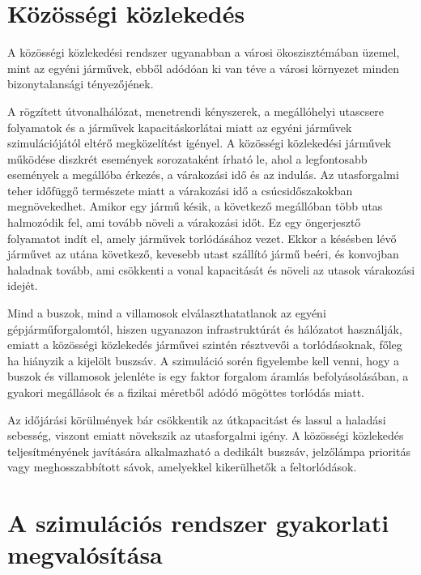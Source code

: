 \documentclass[14pt,a4paper]{extarticle}
\begin{document}
\section{Közösségi közlekedés}
A közösségi közlekedési rendszer ugyanabban a városi ökoszisztémában üzemel, mint az egyéni járművek, ebből adódóan ki van téve a városi környezet minden bizonytalansági tényezőjének.

A rögzített útvonalhálózat, menetrendi kényszerek, a megállóhelyi utascsere folyamatok és a járművek kapacitáskorlátai miatt az egyéni járművek szimulációjától eltérő megközelítést igényel. A közösségi közlekedési járművek működése diszkrét események sorozataként írható le, ahol a legfontosabb események a megállóba érkezés, a várakozási idő és az indulás. Az utasforgalmi teher időfüggő természete miatt a várakozási idő a csúcsidőszakokban megnövekedhet. Amikor egy jármű késik, a következő megállóban több utas halmozódik fel, ami tovább növeli a várakozási időt. Ez egy öngerjesztő folyamatot indít el, amely járművek torlódásához vezet. Ekkor a késésben lévő járművet az utána következő, kevesebb utast szállító jármű beéri, és konvojban haladnak tovább, ami csökkenti a vonal kapacitását és növeli az utasok várakozási idejét.

Mind a buszok, mind a villamosok elválaszthatatlanok az egyéni gépjárműforgalomtól, hiszen ugyanazon infrastruktúrát és hálózatot használják, emiatt a közösségi közlekedés járművei szintén résztvevői a torlódásoknak, főleg ha hiányzik a kijelölt buszsáv. A szimuláció sorén figyelembe kell venni, hogy a buszok és villamosok jelenléte is egy faktor forgalom áramlás befolyásolásában, a gyakori megállások és a fizikai méretből adódó mögöttes torlódás miatt.

Az időjárási körülmények bár csökkentik az útkapacitást és lassul a haladási sebesség, viszont emiatt növekszik az utasforgalmi igény. A közösségi közlekedés teljesítményének javítására alkalmazható a dedikált buszsáv, jelzőlámpa prioritás vagy meghosszabbított sávok, amelyekkel kikerülhetők a feltorlódások.

\section{A szimulációs rendszer gyakorlati megvalósítása}
\end{document}
